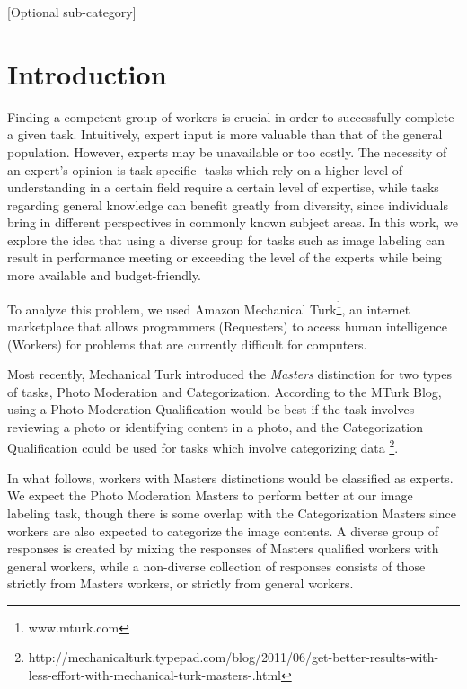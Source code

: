 \documentclass{chi2012}
\newcommand{\tab}{\hspace*{2em}}
\begin{document}

[Optional sub-category]

\terms{
}

\section{Introduction}

\tab Finding a competent group of workers is crucial in order to successfully complete a given task. Intuitively, expert input is more valuable than that of the general population.  However, experts may be unavailable or too costly. The necessity of an expert's opinion is task specific- tasks which rely on a higher level of understanding in a certain field require a certain level of expertise, while tasks regarding general knowledge can benefit greatly from diversity, since individuals bring in different perspectives in commonly known subject areas. In this work, we explore the idea that using a diverse group for tasks such as image labeling can result in performance meeting or exceeding the level of the experts while being more available and budget-friendly.

\tab To analyze this problem, we used Amazon Mechanical Turk\footnote{www.mturk.com}, an internet marketplace that allows programmers (Requesters) to access human intelligence (Workers) for problems that are currently difficult for computers. 

\tab Most recently, Mechanical Turk introduced the \textit{Masters} distinction for two types of tasks, Photo Moderation and Categorization. According to the MTurk Blog, using a Photo Moderation Qualification would be best if the task involves reviewing a photo or identifying content in a photo, and the Categorization Qualification could be used for tasks which involve categorizing data \footnote{http://mechanicalturk.typepad.com/blog/2011/06/get-better-results-with-less-effort-with-mechanical-turk-masters-.html}.

\tab In what follows, workers with Masters distinctions would be classified as experts. We expect the Photo Moderation Masters to perform better at our image labeling task, though there is some overlap with the Categorization Masters since workers are also expected to categorize the image contents. A diverse group of responses is created by mixing the responses of Masters qualified workers with general workers, while a non-diverse collection of responses consists of those strictly from Masters workers, or strictly from general workers.
\end{document}
